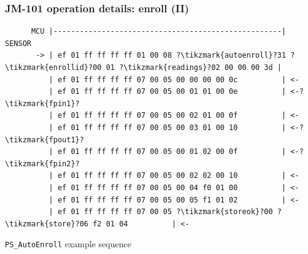 \documentclass[handout]{beamer}
\begin{document}
\begin{frame}[fragile]
  \frametitle{JM-101 operation details: enroll (II)}

  \vspace{3.5em}

  \begin{listing}[H]
    \begin{verbatim}
      MCU |----------------------------------------------------| SENSOR
       -> | ef 01 ff ff ff ff 01 00 08 ?\tikzmark{autoenroll}?31 ?\tikzmark{enrollid}?00 01 ?\tikzmark{readings}?02 00 00 00 3d |
          | ef 01 ff ff ff ff 07 00 05 00 00 00 00 0c          | <-
          | ef 01 ff ff ff ff 07 00 05 00 01 01 00 0e          | <-?\tikzmark{fpin1}?
          | ef 01 ff ff ff ff 07 00 05 00 02 01 00 0f          | <-
          | ef 01 ff ff ff ff 07 00 05 00 03 01 00 10          | <-?\tikzmark{fpout1}?
          | ef 01 ff ff ff ff 07 00 05 00 01 02 00 0f          | <-?\tikzmark{fpin2}?
          | ef 01 ff ff ff ff 07 00 05 00 02 02 00 10          | <-
          | ef 01 ff ff ff ff 07 00 05 00 04 f0 01 00          | <-
          | ef 01 ff ff ff ff 07 00 05 00 05 f1 01 02          | <-
          | ef 01 ff ff ff ff 07 00 05 ?\tikzmark{storeok}?00 ?\tikzmark{store}?06 f2 01 04          | <-
    \end{verbatim}
    \caption{\texttt{PS\_AutoEnroll} example sequence}
  \end{listing}


\end{frame}
\end{document}
